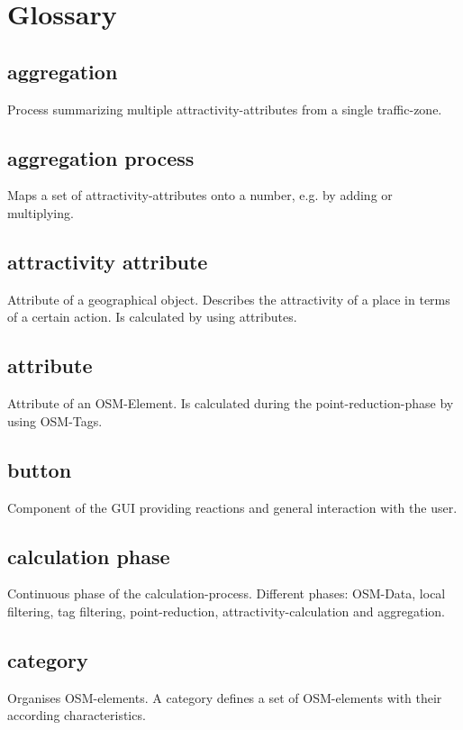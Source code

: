\documentclass[letterpaper,10pt,english]{sphinxmanual}
\begin{document}
\chapter{Glossary}
\label{\detokenize{index:Glossary}}
\sphinxstepscope


\section*{aggregation}
Process summarizing multiple attractivity-attributes from a single traffic-zone.

\section*{aggregation process}
Maps a set of attractivity-attributes onto a number, e.g. by adding or multiplying.

\section*{attractivity attribute}
Attribute of a geographical object. Describes the attractivity of a place in terms of a certain action. Is calculated by using attributes.

\section*{attribute}
Attribute of an OSM-Element. Is calculated during the point-reduction-phase by using OSM-Tags.

\section*{button}
Component of the GUI providing reactions and general interaction with the user.

\section*{calculation phase}
Continuous phase of the calculation-process. Different phases: OSM-Data, local filtering, tag filtering, point-reduction, attractivity-calculation and aggregation.

\section*{category}
Organises OSM-elements. A category defines a set of OSM-elements with their according characteristics.
\end{document}

